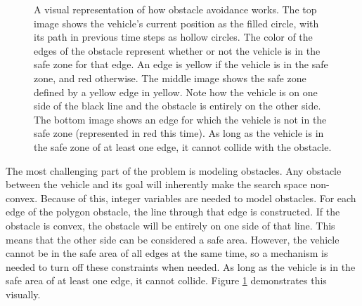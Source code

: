 \begin{figure}[!t]
    \centering
    \hfil
     \hfil
    \caption{A visual representation of how obstacle avoidance works. The top image shows the vehicle's current position as the filled circle, with its path in previous time steps as hollow circles. The color of the edges of the obstacle represent whether or not the vehicle is in the safe zone for that edge. An edge is yellow if the vehicle is in the safe zone, and red otherwise. The middle image shows the safe zone defined by a yellow edge in yellow. Note how the vehicle is on one side of the black line and the obstacle is entirely on the other side. The bottom image shows an edge for which the vehicle is not in the safe zone (represented in red this time). As long as the vehicle is in the safe zone of at least one edge, it cannot collide with the obstacle.}\label{fig:obs}
\end{figure}
The most challenging part of the problem is modeling obstacles. Any obstacle between the vehicle and its goal will inherently make the search space non-convex. Because of this, integer variables are needed to model obstacles. For each edge of the polygon obstacle, the line through that edge is constructed. If the obstacle is convex, the obstacle will be entirely on one side of that line. This means that the other side can be considered a safe area. However, the vehicle cannot be in the safe area of all edges at the same time, so a mechanism is needed to turn off these constraints when needed. As long as the vehicle is in the safe area of at least one edge, it cannot collide.  Figure \ref{fig:obs} demonstrates this visually. \\
